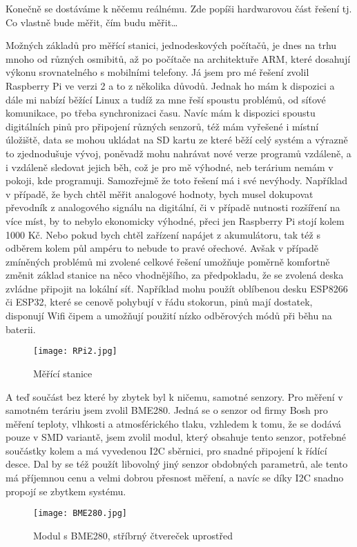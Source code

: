 Konečně se dostáváme k něčemu reálnému. Zde popíši hardwarovou část řešení tj. Co vlastně bude měřit, čím budu 
měřit\ldots

Možných základů pro měřící stanici, jednodeskových počítačů, je dnes na trhu mnoho od různých osmibitů, až po počítače 
na architektuře ARM,  které dosahují výkonu srovnatelného s mobilními telefony. Já jsem pro mé řešení zvolil Raspberry 
Pi ve verzi 2 a to z několika důvodů. Jednak ho mám k dispozici a dále mi nabízí běžící Linux a tudíž za mne řeší 
spoustu problémů, od síťové komunikace, po třeba synchronizaci času. Navíc mám k dispozici spoustu digitálních pinů pro 
připojení různých senzorů, též mám vyřešené i místní úložiště, data se mohou ukládat na SD kartu ze které běží celý 
systém a výrazně to zjednodušuje vývoj, poněvadž mohu nahrávat nové verze programů vzdáleně, a i vzdáleně sledovat 
jejich běh, což je pro mě výhodné, neb terárium nemám v pokoji, kde programuji. Samozřejmě že toto řešení má i své 
nevýhody. Například v případě, že bych chtěl měřit analogové hodnoty, bych musel dokupovat převodník z analogového 
signálu na digitální, či v případě nutnosti rozšíření na více míst, by to nebylo ekonomicky výhodné, přeci jen Raspberry 
Pi stojí kolem 1000 Kč. Nebo pokud bych chtěl zařízení napájet z akumulátoru, tak též s odběrem kolem půl ampéru to 
nebude to pravé ořechové. Avšak v případě zmíněných problémů mi zvolené celkové řešení umožňuje poměrně komfortně změnit 
základ stanice na něco vhodnějšího, za předpokladu, že se zvolená deska zvládne připojit na lokální síť. Například mohu 
použít oblíbenou desku ESP8266 či ESP32, které se cenově pohybují v řádu stokorun, pinů mají dostatek, disponují Wifi 
čipem a umožňují použití nízko odběrových módů při běhu na baterii.
\begin{figure}[H]
		\centering
    \texttt{[image: RPi2.jpg]}
    \caption{Měřící stanice}
\end{figure}

A teď součást bez které by zbytek byl k ničemu, samotné senzory. Pro měření v samotném teráriu jsem zvolil BME280. Jedná 
se o senzor od firmy Bosh pro měření teploty, vlhkosti a atmosférického tlaku, vzhledem k tomu, že se dodává pouze v SMD 
variantě, jsem zvolil modul, který obsahuje tento senzor, potřebné součástky kolem a má vyvedenou I2C sběrnici, pro 
snadné připojení k řídící desce. Dal by se též použít libovolný jiný senzor obdobných parametrů, ale tento má příjemnou 
cenu a velmi dobrou přesnost měření, a navíc se díky I2C snadno propojí se zbytkem systému.
\begin{figure}[H]
		\centering
    \texttt{[image: BME280.jpg]}
    \caption{Modul s BME280, stříbrný čtvereček uprostřed}
\end{figure}

